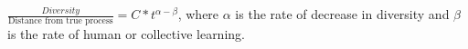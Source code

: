 $\frac{Diversity}{\text{Distance from true process}}=C*t^{\alpha - \beta}$, where $\alpha$ is the rate of decrease in diversity and $\beta$ is the rate of human or collective learning. 
  
  